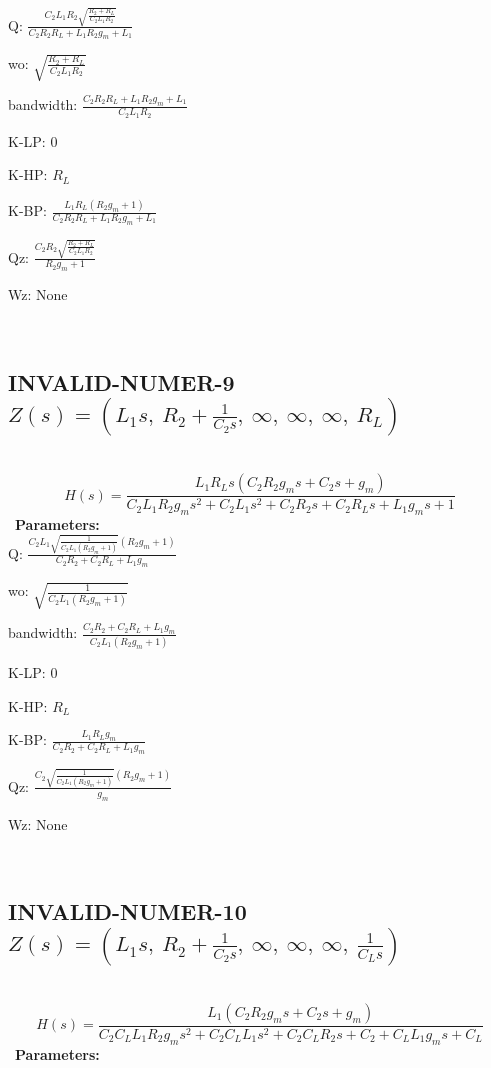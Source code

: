 \documentclass{article}
\begin{document}
Q: $\frac{C_{2} L_{1} R_{2} \sqrt{\frac{R_{2} + R_{L}}{C_{2} L_{1} R_{2}}}}{C_{2} R_{2} R_{L} + L_{1} R_{2} g_{m} + L_{1}}$\ 

wo: $\sqrt{\frac{R_{2} + R_{L}}{C_{2} L_{1} R_{2}}}$\ 

bandwidth: $\frac{C_{2} R_{2} R_{L} + L_{1} R_{2} g_{m} + L_{1}}{C_{2} L_{1} R_{2}}$\ 

K-LP: $0$\ 

K-HP: $R_{L}$\ 

K-BP: $\frac{L_{1} R_{L} \left(R_{2} g_{m} + 1\right)}{C_{2} R_{2} R_{L} + L_{1} R_{2} g_{m} + L_{1}}$\ 

Qz: $\frac{C_{2} R_{2} \sqrt{\frac{R_{2} + R_{L}}{C_{2} L_{1} R_{2}}}}{R_{2} g_{m} + 1}$\ 

Wz: $\text{None}$\ 

\ 

\subsection{INVALID-NUMER-9 $Z(s) = \left( L_{1} s, \  R_{2} + \frac{1}{C_{2} s}, \  \infty, \  \infty, \  \infty, \  R_{L}\right)$ } \ 
\textbf{\[H(s) = \frac{L_{1} R_{L} s \left(C_{2} R_{2} g_{m} s + C_{2} s + g_{m}\right)}{C_{2} L_{1} R_{2} g_{m} s^{2} + C_{2} L_{1} s^{2} + C_{2} R_{2} s + C_{2} R_{L} s + L_{1} g_{m} s + 1}\] } \ 
\textbf{Parameters:}\\ 

Q: $\frac{C_{2} L_{1} \sqrt{\frac{1}{C_{2} L_{1} \left(R_{2} g_{m} + 1\right)}} \left(R_{2} g_{m} + 1\right)}{C_{2} R_{2} + C_{2} R_{L} + L_{1} g_{m}}$\ 

wo: $\sqrt{\frac{1}{C_{2} L_{1} \left(R_{2} g_{m} + 1\right)}}$\ 

bandwidth: $\frac{C_{2} R_{2} + C_{2} R_{L} + L_{1} g_{m}}{C_{2} L_{1} \left(R_{2} g_{m} + 1\right)}$\ 

K-LP: $0$\ 

K-HP: $R_{L}$\ 

K-BP: $\frac{L_{1} R_{L} g_{m}}{C_{2} R_{2} + C_{2} R_{L} + L_{1} g_{m}}$\ 

Qz: $\frac{C_{2} \sqrt{\frac{1}{C_{2} L_{1} \left(R_{2} g_{m} + 1\right)}} \left(R_{2} g_{m} + 1\right)}{g_{m}}$\ 

Wz: $\text{None}$\ 

\ 

\subsection{INVALID-NUMER-10 $Z(s) = \left( L_{1} s, \  R_{2} + \frac{1}{C_{2} s}, \  \infty, \  \infty, \  \infty, \  \frac{1}{C_{L} s}\right)$ } \ 
\textbf{\[H(s) = \frac{L_{1} \left(C_{2} R_{2} g_{m} s + C_{2} s + g_{m}\right)}{C_{2} C_{L} L_{1} R_{2} g_{m} s^{2} + C_{2} C_{L} L_{1} s^{2} + C_{2} C_{L} R_{2} s + C_{2} + C_{L} L_{1} g_{m} s + C_{L}}\] } \ 
\textbf{Parameters:}\\ 
\end{document}

